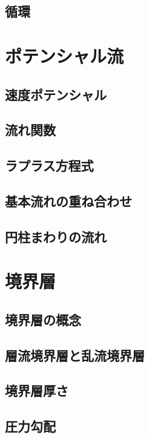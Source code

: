 \documentclass[uplatex,dvipdfmx,a4j,11pt]{jsreport}
\numberwithin{equation}{chapter}
\begin{document}
\subsection{循環}

\section{ポテンシャル流}

\subsection{速度ポテンシャル}

\subsection{流れ関数}

\subsection{ラプラス方程式}

\subsection{基本流れの重ね合わせ}

\subsection{円柱まわりの流れ}

\section{境界層}

\subsection{境界層の概念}

\subsection{層流境界層と乱流境界層}

\subsection{境界層厚さ}

\subsection{圧力勾配}
\end{document}

